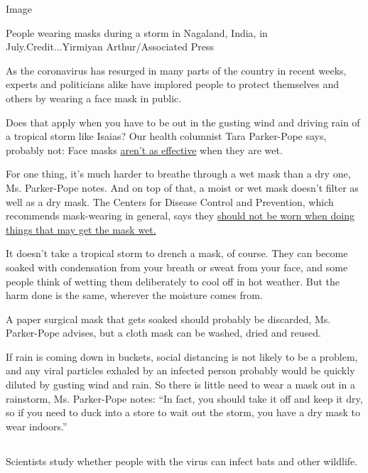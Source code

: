 Image

People wearing masks during a storm in Nagaland, India, in
July.Credit...Yirmiyan Arthur/Associated Press

As the coronavirus has resurged in many parts of the country in recent
weeks, experts and politicians alike have implored people to protect
themselves and others by wearing a face mask in public.

Does that apply when you have to be out in the gusting wind and driving
rain of a tropical storm like Isaias? Our health columnist Tara
Parker-Pope says, probably not: Face masks
\href{https://www.nursingtimes.net/clinical-archive/infection-control/the-effectiveness-of-surgical-face-masks-what-the-literature-shows-30-09-2003/}{aren't
as effective} when they are wet.

For one thing, it's much harder to breathe through a wet mask than a dry
one, Ms. Parker-Pope notes. And on top of that, a moist or wet mask
doesn't filter as well as a dry mask. The Centers for Disease Control
and Prevention, which recommends mask-wearing in general, says they
\href{https://www.cdc.gov/coronavirus/2019-ncov/prevent-getting-sick/cloth-face-cover-guidance.html}{should
not be worn when doing things that may get the mask wet. }

It doesn't take a tropical storm to drench a mask, of course. They can
become soaked with condensation from your breath or sweat from your
face, and some people think of wetting them deliberately to cool off in
hot weather. But the harm done is the same, wherever the moisture comes
from.

A paper surgical mask that gets soaked should probably be discarded, Ms.
Parker-Pope advises, but a cloth mask can be washed, dried and reused.

If rain is coming down in buckets, social distancing is not likely to be
a problem, and any viral particles exhaled by an infected person
probably would be quickly diluted by gusting wind and rain. So there is
little need to wear a mask out in a rainstorm, Ms. Parker-Pope notes:
``In fact, you should take it off and keep it dry, so if you need to
duck into a store to wait out the storm, you have a dry mask to wear
indoors.''

\hypertarget{-10}{%
\subsection{}\label{-10}}

Scientists study whether people with the virus can infect bats and other
wildlife.

